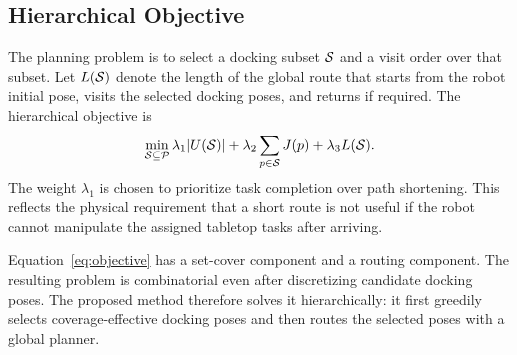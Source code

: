 \subsection{Hierarchical Objective}
The planning problem is to select a docking subset \(\mathcal{S}\) and a visit order over that subset. Let \(L(\mathcal{S})\) denote the length of the global route that starts from the robot initial pose, visits the selected docking poses, and returns if required. The hierarchical objective is
\begin{equation}
\min_{\mathcal{S}\subseteq\mathcal{P}}
    \lambda_1 |U(\mathcal{S})|
    + \lambda_2 \sum_{p\in\mathcal{S}} J(p)
    + \lambda_3 L(\mathcal{S}).
\label{eq:objective}
\end{equation}
The weight \(\lambda_1\) is chosen to prioritize task completion over path shortening. This reflects the physical requirement that a short route is not useful if the robot cannot manipulate the assigned tabletop tasks after arriving.

\begin{remark}
Equation~\eqref{eq:objective} has a set-cover component and a routing component. The resulting problem is combinatorial even after discretizing candidate docking poses. The proposed method therefore solves it hierarchically: it first greedily selects coverage-effective docking poses and then routes the selected poses with a global planner.
\end{remark}
